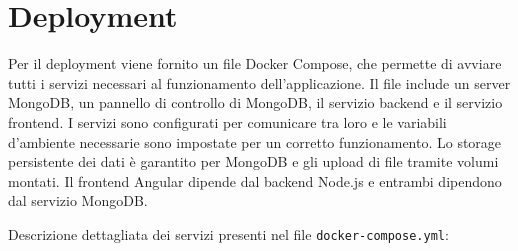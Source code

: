 \chapter{Deployment}

Per il deployment viene fornito un file Docker Compose, che permette di avviare tutti i servizi necessari al funzionamento dell'applicazione. Il file include un server MongoDB, un pannello di controllo di MongoDB, il servizio backend e il servizio frontend. I servizi sono configurati per comunicare tra loro e le variabili d'ambiente necessarie sono impostate per un corretto funzionamento. Lo storage persistente dei dati è garantito per MongoDB e gli upload di file tramite volumi montati. Il frontend Angular dipende dal backend Node.js e entrambi dipendono dal servizio MongoDB.

Descrizione dettagliata dei servizi presenti nel file \texttt{docker-compose.yml}:

